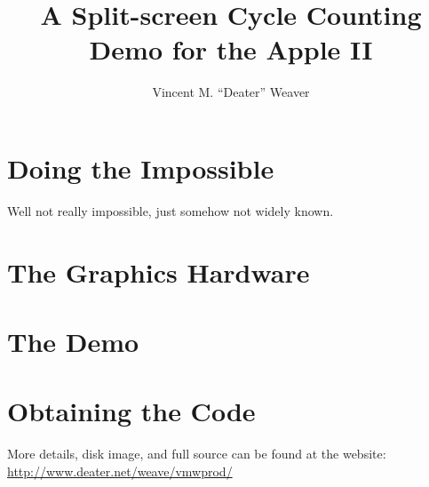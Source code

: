 \documentclass[twocolumn]{article}
\begin{document}
\title{A Split-screen Cycle Counting Demo for the Apple II}
\author{Vincent M. ``Deater'' Weaver}
\date{}
\maketitle


\section{Doing the Impossible}

Well not really impossible, just somehow not widely known.

\section{The Graphics Hardware}

\section{The Demo}

\section{Obtaining the Code}

More details, disk image, and full source can be found at the website:
\url{http://www.deater.net/weave/vmwprod/}
\end{document}
